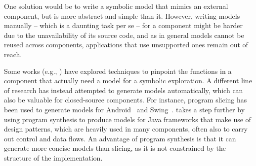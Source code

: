{One solution would be to write a symbolic model that mimics an external component, but is more abstract and simple than it. However, writing models manually -- which is a daunting task per se -- for a component might be harder due to the unavailability of its source code,  and as in general models cannot be reused across components, applications that use unsupported ones remain out of reach. 

Some works (e.g., \cite{AOH-TACAS07,XXT-ICSE11}) have explored techniques to pinpoint the functions in a component that actually need a model for a symbolic exploration. A different line of research has instead attempted to generate models automatically, which can also be valuable for closed-source components. For instance, program slicing has been used to generate models for Android~\cite{VTV-SEN15} and Swing~\cite{CT-SEN14}. \cite{JQF-ICSE16} takes a step further by using program synthesis to produce models for Java frameworks that make use of design patterns, which are heavily used in many components, often also to carry out control and data flows. An advantage of program synthesis is that it can generate more concise models than slicing, as it is not constrained by the structure of the implementation. %


}